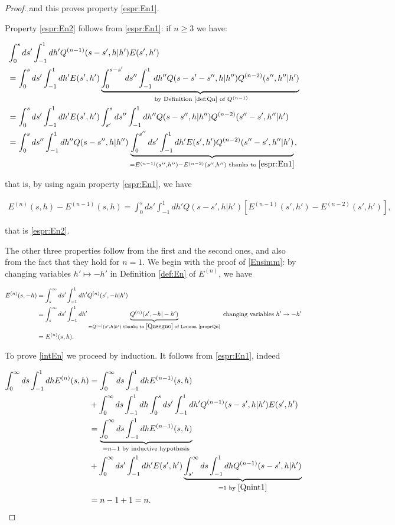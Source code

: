 \documentclass[a4paper,10pt,reqno]{amsart}
\numberwithin{equation}{subsection}
\numberwithin{figure}{subsection}
\begin{document}
\begin{proof}
and this proves property \eqref{espr:En1}.

Property \eqref{espr:En2} follows from \eqref{espr:En1}: if $n\geq3$ we have:

\begin{align*}
&\int_0^sds'\int_{-1}^1dh'Q^{(n-1)}(s-s',h|h')E(s',h')
\\
&=\int_0^sds'\int_{-1}^1dh'E(s',h')\underbrace{\int_0^{s-s'}ds''\int_{-1}^1dh''Q(s-s'-s'',h|h'')Q^{(n-2)}(s'',h''|h')}_{\textrm{ by Definition \ref{def:Qn} of }Q^{(n-1)}}
\\
&=\int_0^sds'\int_{-1}^1dh'E(s',h')\int_{s'}^sds''\int_{-1}^1dh''Q(s-s'',h|h'')Q^{(n-2)}(s''-s',h''|h')
\\
&=\int_0^sds''\int_{-1}^1dh''Q(s-s'',h|h'')\underbrace{\int_0^{s''}ds'\int_{-1}^1dh'E(s',h')Q^{(n-2)}(s''-s',h''|h')}_{=E^{(n-1)}(s'',h'')-E^{(n-2)}(s'',h'')\textrm{ thanks to }\eqref{espr:En1}},
\end{align*}

that is, by using again property \eqref{espr:En1}, we have

{\small\begin{align*}
E^{(n)}(s,h)-E^{(n-1)}(s,h)=\int_0^sds'\int_{-1}^1dh'Q(s-s',h|h')\left[E^{(n-1)}(s',h')-E^{(n-2)}(s',h')\right],
\end{align*}}

that is \eqref{espr:En2}.

The other three properties follow from the first and the second ones, and also from the fact that they hold for $n=1$. We begin with the proof of \eqref{Ensimm}: by changing variables $h'\mapsto-h'$ in Definition \ref{def:En} of $E^{(n)}$, we have

{\scriptsize\begin{align*}
E^{(n)}(s,-h)&=\int_s^{\infty}ds'\int_{-1}^1dh'Q^{(n)}(s',-h|h')
\\
&=\int_s^{\infty}ds'\int_{-1}^1dh'\underbrace{Q^{(n)}(s',-h|-h')}_{=Q^{(n)}(s',h|h')\textrm{ thanks to }\eqref{Qnsegno}\textrm{ of Lemma \ref{proprQn}}}\textrm{ changing variables }h'\to-h'
\\
&=E^{(n)}(s,h).
\end{align*}}

To prove \eqref{intEn} we proceed by induction. It follows from \eqref{espr:En1}, indeed

{\small\begin{align*}
\int_0^{\infty}ds\int_{-1}^1dhE^{(n)}(s,h)&=\int_0^{\infty}ds\int_{-1}^1dhE^{(n-1)}(s,h)
\\
&+\int_0^{\infty}ds\int_{-1}^1dh\int_0^sds'\int_{-1}^1dh'Q^{(n-1)}(s-s',h|h')E(s',h')
\\
&=\underbrace{\int_0^{\infty}ds\int_{-1}^1dhE^{(n-1)}(s,h)}_{=n-1\textrm{ by inductive hypothesis}}
\\
&+\int_0^{\infty}ds'\int_{-1}^1dh'E(s',h')\underbrace{\int_{s'}^{\infty}ds\int_{-1}^1dhQ^{(n-1)}(s-s',h|h')}_{=1\textrm{ by }\eqref{Qnint1}}
\\
&=n-1+1=n.
\end{align*}}


\end{proof}
\end{document}
